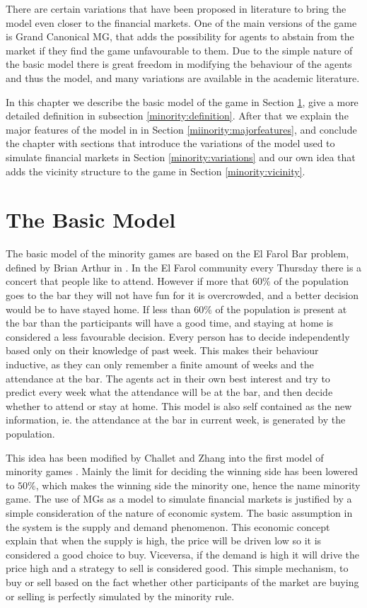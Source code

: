 There are certain variations that have been proposed in literature to bring the model even closer to the financial markets.
One of the main versions of the game is Grand Canonical MG, that adds the possibility for agents to abstain from the market if they find the game unfavourable to them.
Due to the simple nature of the basic model there is great freedom in modifying the behaviour of the agents and thus the model, and many variations are available in the academic literature.

In this chapter we describe the basic model of the game in Section \ref{minority:basicmodel}, give a more detailed definition in subsection \ref{minority:definition}. After that we explain the major features of the model in in Section \ref{miinority:majorfeatures}, and conclude the chapter with sections that introduce the variations of the model used to simulate financial markets in Section \ref{minority:variations} and our own idea that adds the vicinity structure to the game in Section \ref{minority:vicinity}.

\section{The Basic Model}
\label{minority:basicmodel}

The basic model of the minority games are based on the El Farol Bar problem, defined by Brian Arthur in \cite{arthur1994inductive}.
In the El Farol community every Thursday there is a concert that people like to attend.
However if more that $60\%$ of the population goes to the bar they will not have fun for it is overcrowded, and a better decision would be to have stayed home.
If less than $60\%$ of the population is present at the bar than the participants will have a good time, and staying at home is considered a less favourable decision.
Every person has to decide independently based only on their knowledge of past week.
This makes their behaviour inductive, as they can only remember a finite amount of weeks and the attendance at the bar.
The agents act in their own best interest and try to predict every week what the attendance will be at the bar, and then decide whether to attend or stay at home.
This model is also self contained as the new information, ie. the attendance at the bar in current week, is generated by the population.

This idea has been modified by Challet and Zhang into the first model of minority games \cite{challet1997emergence}.
Mainly the limit for deciding the winning side has been lowered to $50\%$, which makes the winning side the minority one, hence the name minority game.
The use of MGs as a model to simulate financial markets is justified by a simple consideration of the nature of economic system.
The basic assumption in the system is the supply and demand phenomenon.
This economic concept explain that when the supply is high, the price will be driven low so it is considered a good choice to buy.
Viceversa, if the demand is high it will drive the price high and a strategy to sell is considered good.
This simple mechanism, to buy or sell based on the fact whether other participants of the market are buying or selling is perfectly simulated by the minority rule.

